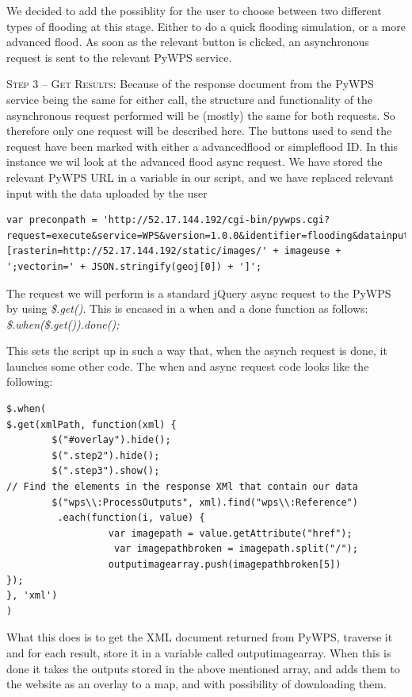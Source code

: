 We decided to add the possiblity for the user to choose between two different types of flooding at this stage. Either to do a quick flooding simulation, or a more advanced flood.
As soon as the relevant button is clicked, an asynchronous request is sent to the relevant PyWPS service.

\textsc{Step 3 – Get Results:}
Because of the response document from the PyWPS service being the same for either call, the structure and functionality of the asynchronous request performed will be (mostly) the same for both requests. So therefore only one request will be described here. 
The buttons used to send the request have been marked with either a advancedflood or simpleflood ID. In this instance we wil look at the advanced flood async request.
We have stored the relevant PyWPS URL in a variable in our script, and we have replaced relevant input with the data uploaded by the user 

\begin{lstlisting}
var preconpath = 'http://52.17.144.192/cgi-bin/pywps.cgi?request=execute&service=WPS&version=1.0.0&identifier=flooding&datainputs=[rasterin=http://52.17.144.192/static/images/' + imageuse + ';vectorin=' + JSON.stringify(geoj[0]) + ']';
\end{lstlisting}

The request we will perform is a standard jQuery async request to the PyWPS by using \textit{\$.get()}. This is encased in a when and a done function as follows: \textit{\$.when(\$.get()).done();}

This sets the script up in such a way that, when the asynch request is done, it launches some other code. 
The when and async request code looks like the following:

\begin{lstlisting}
$.when(
$.get(xmlPath, function(xml) {
        $("#overlay").hide();
        $(".step2").hide();
        $(".step3").show();
// Find the elements in the response XMl that contain our data
        $("wps\\:ProcessOutputs", xml).find("wps\\:Reference")
         .each(function(i, value) {
                  var imagepath = value.getAttribute("href");
                   var imagepathbroken = imagepath.split("/");
                  outputimagearray.push(imagepathbroken[5])
});
}, 'xml')
)
\end{lstlisting}

What this does is to get the XML document returned from PyWPS, traverse it and for each result, store it in a variable called outputimagearray.
When this is done it takes the outputs stored in the above mentioned array, and adds them to the website as an overlay to a map, and with possibility of downloading them.

